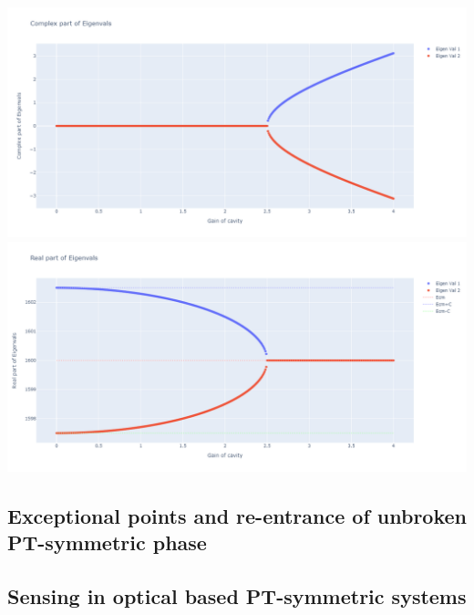 \documentclass[11pt]{book}
\theoremstyle{break}
\theoremstyle{break}
\begin{document}
\begin{center}
\includegraphics[scale=0.35]{2x2HamComp.png}
\includegraphics[scale=0.35]{2x2HamReal.png}
\end{center}
\subsection{Exceptional points and re-entrance of unbroken PT-symmetric phase}
\subsection{Sensing in optical based PT-symmetric systems}



\newpage
\end{document}
